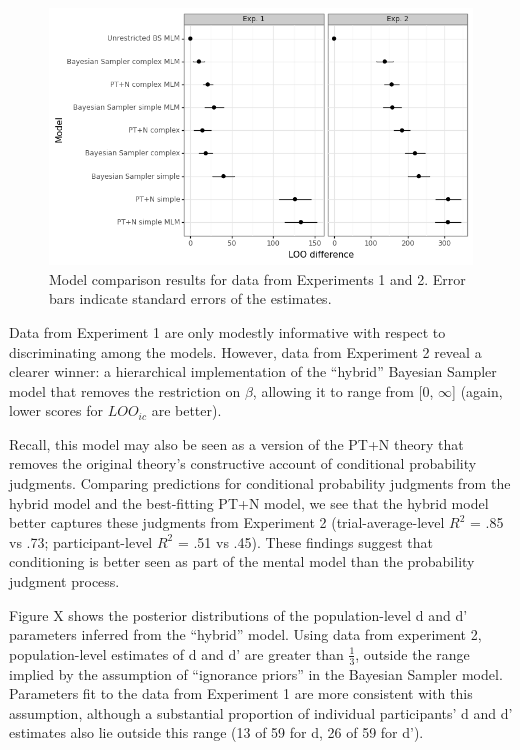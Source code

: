 \documentclass[
  english,
  man,floatsintext]{apa6}
\begin{document}
\begin{figure}[ht]
\centering
\includegraphics[width=6in]{plot_compare.png}
\caption{Model comparison results for data from Experiments 1 and 2. Error bars indicate standard errors of the estimates.}
\end{figure}

Data from Experiment 1 are only modestly informative with respect to discriminating among the models. However, data from Experiment 2 reveal a clearer winner: a hierarchical implementation of the ``hybrid'' Bayesian Sampler model that removes the restriction on \(\beta\), allowing it to range from {[}0, \(\infty\){]} (again, lower scores for \(LOO_{ic}\) are better).

Recall, this model may also be seen as a version of the PT+N theory that removes the original theory's constructive account of conditional probability judgments. Comparing predictions for conditional probability judgments from the hybrid model and the best-fitting PT+N model, we see that the hybrid model better captures these judgments from Experiment 2 (trial-average-level \(R^2\) = .85 vs .73; participant-level \(R^2\) = .51 vs .45). These findings suggest that conditioning is better seen as part of the mental model than the probability judgment process.

Figure X shows the posterior distributions of the population-level d and d' parameters inferred from the ``hybrid'' model. Using data from experiment 2, population-level estimates of d and d' are greater than \(\frac{1}{3}\), outside the range implied by the assumption of ``ignorance priors'' in the Bayesian Sampler model. Parameters fit to the data from Experiment 1 are more consistent with this assumption, although a substantial proportion of individual participants' d and d' estimates also lie outside this range (13 of 59 for d, 26 of 59 for d').
\end{document}
